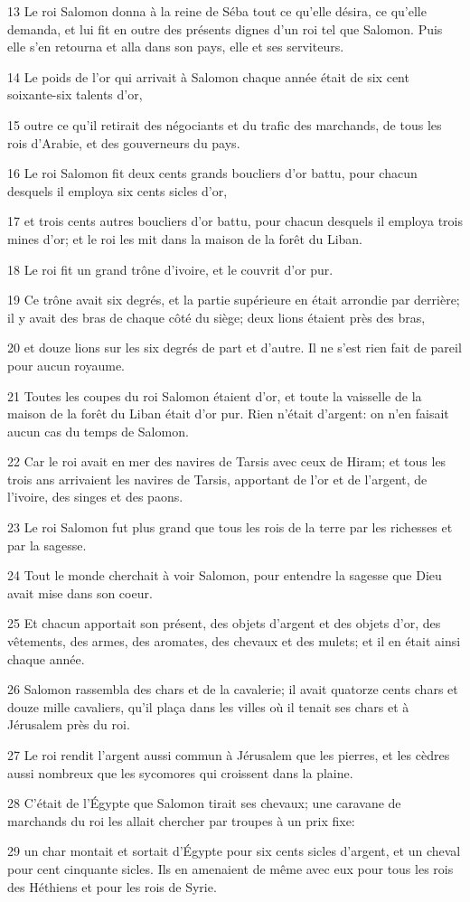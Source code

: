 \par 13 Le roi Salomon donna à la reine de Séba tout ce qu'elle désira, ce qu'elle demanda, et lui fit en outre des présents dignes d'un roi tel que Salomon. Puis elle s'en retourna et alla dans son pays, elle et ses serviteurs.
\par 14 Le poids de l'or qui arrivait à Salomon chaque année était de six cent soixante-six talents d'or,
\par 15 outre ce qu'il retirait des négociants et du trafic des marchands, de tous les rois d'Arabie, et des gouverneurs du pays.
\par 16 Le roi Salomon fit deux cents grands boucliers d'or battu, pour chacun desquels il employa six cents sicles d'or,
\par 17 et trois cents autres boucliers d'or battu, pour chacun desquels il employa trois mines d'or; et le roi les mit dans la maison de la forêt du Liban.
\par 18 Le roi fit un grand trône d'ivoire, et le couvrit d'or pur.
\par 19 Ce trône avait six degrés, et la partie supérieure en était arrondie par derrière; il y avait des bras de chaque côté du siège; deux lions étaient près des bras,
\par 20 et douze lions sur les six degrés de part et d'autre. Il ne s'est rien fait de pareil pour aucun royaume.
\par 21 Toutes les coupes du roi Salomon étaient d'or, et toute la vaisselle de la maison de la forêt du Liban était d'or pur. Rien n'était d'argent: on n'en faisait aucun cas du temps de Salomon.
\par 22 Car le roi avait en mer des navires de Tarsis avec ceux de Hiram; et tous les trois ans arrivaient les navires de Tarsis, apportant de l'or et de l'argent, de l'ivoire, des singes et des paons.
\par 23 Le roi Salomon fut plus grand que tous les rois de la terre par les richesses et par la sagesse.
\par 24 Tout le monde cherchait à voir Salomon, pour entendre la sagesse que Dieu avait mise dans son coeur.
\par 25 Et chacun apportait son présent, des objets d'argent et des objets d'or, des vêtements, des armes, des aromates, des chevaux et des mulets; et il en était ainsi chaque année.
\par 26 Salomon rassembla des chars et de la cavalerie; il avait quatorze cents chars et douze mille cavaliers, qu'il plaça dans les villes où il tenait ses chars et à Jérusalem près du roi.
\par 27 Le roi rendit l'argent aussi commun à Jérusalem que les pierres, et les cèdres aussi nombreux que les sycomores qui croissent dans la plaine.
\par 28 C'était de l'Égypte que Salomon tirait ses chevaux; une caravane de marchands du roi les allait chercher par troupes à un prix fixe:
\par 29 un char montait et sortait d'Égypte pour six cents sicles d'argent, et un cheval pour cent cinquante sicles. Ils en amenaient de même avec eux pour tous les rois des Héthiens et pour les rois de Syrie.


